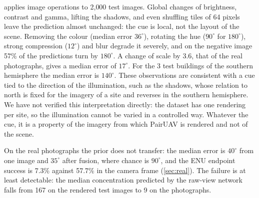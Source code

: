 \documentclass[10pt,twocolumn,letterpaper]{article}
\begin{document}
 applies image operations to 2{,}000 test images. Global changes of brightness, contrast and gamma, lifting the shadows, and even shuffling tiles of 64 pixels leave the prediction almost unchanged: the cue is local, not the layout of the scene. Removing the colour (median error $36^\circ$), rotating the hue ($90^\circ$ for $180^\circ$), strong compression ($12^\circ$) and blur degrade it severely, and on the negative image 57\% of the predictions turn by $180^\circ$. A change of scale by 3.6, that of the real photographs, gives a median error of $17^\circ$. For the 3 test buildings of the southern hemisphere the median error is $140^\circ$. These observations are consistent with a cue tied to the direction of the illumination, such as the shadows, whose relation to north is fixed for the imagery of a site and reverses in the southern hemisphere. We have not verified this interpretation directly: the dataset has one rendering per site, so the illumination cannot be varied in a controlled way. Whatever the cue, it is a property of the imagery from which PairUAV is rendered and not of the scene.

On the real photographs the prior does not transfer: the median error is $40^\circ$ from one image and $35^\circ$ after fusion, where chance is $90^\circ$, and the ENU endpoint success is 7.3\% against 57.7\% in the camera frame (\cref{sec:real}). The failure is at least detectable: the median concentration predicted by the raw-view network falls from 167 on the rendered test images to 9 on the photographs.
\end{document}
